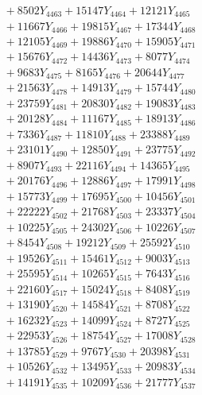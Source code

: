 \documentclass[a4paper,10pt]{article}
\begin{document}
{\begin{align}
&\;  + 8502 Y_{4463} + 15147 Y_{4464} + 12121 Y_{4465} \\[0.3ex]
&\;  + 11667 Y_{4466} + 19815 Y_{4467} + 17344 Y_{4468} \\[0.5ex]\allowbreak
&\;  + 12105 Y_{4469} + 19886 Y_{4470} + 15905 Y_{4471} \\[0.3ex]
&\;  + 15676 Y_{4472} + 14436 Y_{4473} + 8077 Y_{4474} \\[0.3ex]
&\;  + 9683 Y_{4475} + 8165 Y_{4476} + 20644 Y_{4477} \\[0.3ex]
&\;  + 21563 Y_{4478} + 14913 Y_{4479} + 15744 Y_{4480} \\[0.3ex]
&\;  + 23759 Y_{4481} + 20830 Y_{4482} + 19083 Y_{4483} \\[0.3ex]
&\;  + 20128 Y_{4484} + 11167 Y_{4485} + 18913 Y_{4486} \\[0.3ex]
&\;  + 7336 Y_{4487} + 11810 Y_{4488} + 23388 Y_{4489} \\[0.3ex]
&\;  + 23101 Y_{4490} + 12850 Y_{4491} + 23775 Y_{4492} \\[0.3ex]
&\;  + 8907 Y_{4493} + 22116 Y_{4494} + 14365 Y_{4495} \\[0.3ex]
&\;  + 20176 Y_{4496} + 12886 Y_{4497} + 17991 Y_{4498} \\[0.5ex]\allowbreak
&\;  + 15773 Y_{4499} + 17695 Y_{4500} + 10456 Y_{4501} \\[0.3ex]
&\;  + 22222 Y_{4502} + 21768 Y_{4503} + 23337 Y_{4504} \\[0.3ex]
&\;  + 10225 Y_{4505} + 24302 Y_{4506} + 10226 Y_{4507} \\[0.3ex]
&\;  + 8454 Y_{4508} + 19212 Y_{4509} + 25592 Y_{4510} \\[0.3ex]
&\;  + 19526 Y_{4511} + 15461 Y_{4512} + 9003 Y_{4513} \\[0.3ex]
&\;  + 25595 Y_{4514} + 10265 Y_{4515} + 7643 Y_{4516} \\[0.3ex]
&\;  + 22160 Y_{4517} + 15024 Y_{4518} + 8408 Y_{4519} \\[0.3ex]
&\;  + 13190 Y_{4520} + 14584 Y_{4521} + 8708 Y_{4522} \\[0.3ex]
&\;  + 16232 Y_{4523} + 14099 Y_{4524} + 8727 Y_{4525} \\[0.3ex]
&\;  + 22953 Y_{4526} + 18754 Y_{4527} + 17008 Y_{4528} \\[0.5ex]\allowbreak
&\;  + 13785 Y_{4529} + 9767 Y_{4530} + 20398 Y_{4531} \\[0.3ex]
&\;  + 10526 Y_{4532} + 13495 Y_{4533} + 20983 Y_{4534} \\[0.3ex]
&\;  + 14191 Y_{4535} + 10209 Y_{4536} + 21777 Y_{4537} \\[0.3ex]

\end{align}}
\end{document}
